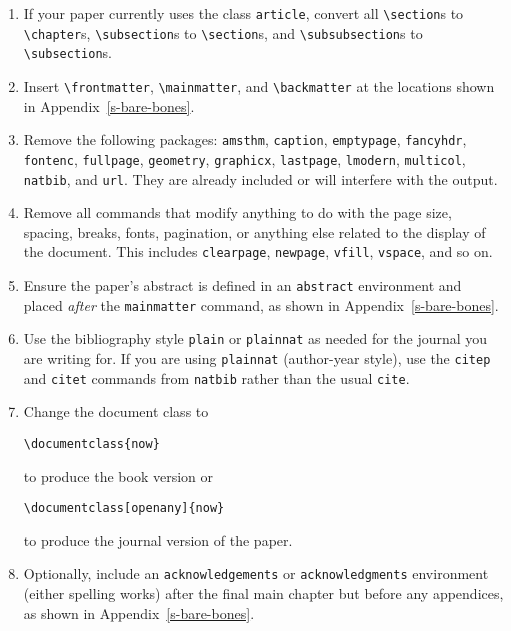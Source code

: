 \documentclass[openany]{now} %
\begin{document}
\begin{enumerate}
\item If your paper currently uses the class \texttt{article}, 
convert all \texttt{\textbackslash section}s to \texttt{\textbackslash chapter}s, 
\texttt{\textbackslash subsection}s to
\texttt{\textbackslash section}s, and \texttt{\textbackslash subsubsection}s 
to \texttt{\textbackslash subsection}s.

\item Insert \texttt{\textbackslash frontmatter}, \texttt{\textbackslash mainmatter},
and \texttt{\textbackslash backmatter} at the locations shown in
Appendix~\ref{s-bare-bones}.

\item Remove the following packages:
\texttt{amsthm},
\texttt{caption},
\texttt{emptypage},
\texttt{fancyhdr},
\texttt{fontenc},
\texttt{fullpage},
\texttt{geometry},
\texttt{graphicx},
\texttt{lastpage},
\texttt{lmodern},
\texttt{multicol},
\texttt{natbib}, and
\texttt{url}.
They are already included or will interfere with the output.

\item Remove all commands that modify anything to do with the page size,
spacing, breaks, fonts, pagination, or anything else related to the display of
the document. This includes \texttt{clearpage}, \texttt{newpage},
\texttt{vfill}, \texttt{vspace}, and so on.

\item Ensure the paper's abstract is defined in an \texttt{abstract}
environment and placed \emph{after} the \texttt{mainmatter} command, as shown
in Appendix~\ref{s-bare-bones}.

\item Use the bibliography style \texttt{plain} or \texttt{plainnat} as needed
for the journal you are writing for. If you are using \texttt{plainnat}
(author-year style), use the \texttt{citep} and \texttt{citet} commands from
\texttt{natbib} rather than the usual \texttt{cite}.

\item Change the document class to

\texttt{\textbackslash documentclass\{now\}}

to produce the book version or 

\texttt{\textbackslash documentclass[openany]\{now\}}

to produce the journal version of the paper.

\item Optionally, include an \texttt{acknowledgements} or \texttt{acknowledgments}
environment (either spelling works) after the final main chapter but before any
appendices, as shown in Appendix~\ref{s-bare-bones}.


\end{enumerate}
\end{document}
